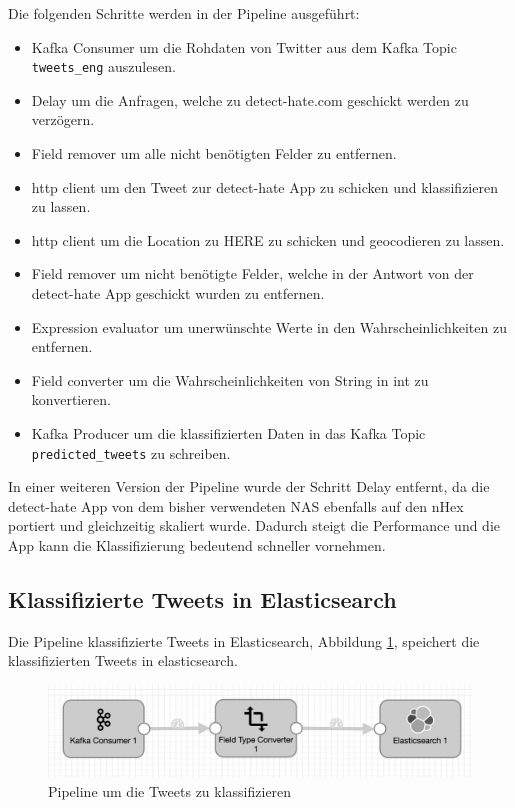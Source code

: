Die folgenden Schritte werden in der Pipeline ausgef{\"u}hrt:

\begin{itemize}
  \item Kafka Consumer um die Rohdaten von Twitter aus dem Kafka Topic \texttt{tweets\_eng} auszulesen.
  \item Delay um die Anfragen, welche zu detect-hate.com geschickt werden zu verz{\"o}gern.
  \item Field remover um alle nicht ben{\"o}tigten Felder zu entfernen. 
  \item http client um den Tweet zur detect-hate App zu schicken und klassifizieren zu lassen.
  \item http client um die Location zu HERE zu schicken und geocodieren zu lassen.
  \item Field remover um nicht ben{\"o}tigte Felder, welche in der Antwort von der detect-hate App geschickt wurden zu entfernen.
  \item Expression evaluator um unerw{\"u}nschte Werte in den Wahrscheinlichkeiten zu entfernen.
  \item Field converter um die Wahrscheinlichkeiten von String in int zu konvertieren.
  \item Kafka Producer um die klassifizierten Daten in das Kafka Topic \texttt{predicted\_tweets} zu schreiben.
\end{itemize}

In einer weiteren Version der Pipeline wurde der Schritt Delay entfernt, da die detect-hate App von dem bisher verwendeten NAS ebenfalls auf den nHex portiert und gleichzeitig skaliert wurde. Dadurch steigt die Performance und die App kann die Klassifizierung bedeutend schneller vornehmen. 

\subsection{Klassifizierte Tweets in Elasticsearch}
\label{sec:tweets_to_elk}

Die Pipeline klassifizierte Tweets in Elasticsearch, Abbildung \ref{fig:pipeline_tweets_to_elk}, speichert die klassifizierten Tweets in elasticsearch.

\begin{figure}[H]
	\centering
		\includegraphics[scale=0.4 ]{images/pipeline_tweets_to_elk.png}
	\caption{Pipeline um die Tweets zu klassifizieren}
	\label{fig:pipeline_tweets_to_elk}
\end{figure}

